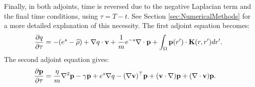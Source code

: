 Finally, in both adjoints, time is reversed due to the negative Laplacian term and the final time conditions, using $\tau = T-t$. See Section \ref{sec:NumericalMethods} for a more detailed explanation of this necessity.
The first adjoint equation becomes:
\begin{align*}
\frac{\partial q}{\partial \tau}  = - (e^s - \widehat \rho)+ \nabla q \cdot \mathbf{v} +\frac{1}{m} e^{-s}\nabla \cdot \mathbf{p}  +  \int_\Omega  \mathbf{p}(r') \cdot\mathbf{K}(r,r')   dr' .
\end{align*}
The second adjoint equation gives:
\begin{align*}
&\frac{\partial \mathbf{p}}{\partial \tau} =   \frac{\eta}{m} \nabla^2 \mathbf{p}  - \gamma\mathbf{p} + e^s\nabla q -(\nabla \mathbf{v})^\top\mathbf{p} 
+ (\mathbf{v} \cdot \nabla)\mathbf{p} +  (\nabla \cdot \mathbf{v})\mathbf{p}  .
\end{align*}